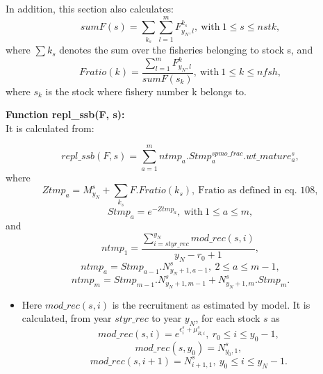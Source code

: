 \documentclass{article}
\begin{document}
In addition, this section also calculates:
\begin{equation}
    sumF(s)=\sum_{k_s}\sum_{l=1}^m F^{k_s}_{y_N,l}, \  \text{with} \ 1\leq s \leq nstk,
\end{equation}
where $\sum k_s$ denotes the sum over the fisheries belonging to stock s, and
\begin{equation}
    Fratio(k)=\dfrac{\sum_{l=1}^mF^k_{y_N,l}}{sumF(s_k)}, \  \text{with} \ 1\leq k  \leq nfsh,
\end{equation}
where $s_k$ is the stock where fishery number k belongs to.

\textbf{Function repl\_ssb(F, s):}\\
It is calculated from:

\begin{equation}
    repl\_ssb(F,s)=\sum_{a=1}^m ntmp_a. Stmp^{spmo\_frac}_a.wt\_mature^s_a,
\end{equation}
where
\begin{equation}
    Ztmp_a=M^s_{y_N}+\sum_{k_s}F.Fratio(k_s), \ \text{Fratio as defined in eq. 108},
\end{equation}
\begin{equation}
    Stmp_a=e^{-Ztmp_a}, \ \text{with} \ 1\leq a \leq m,
\end{equation}
and
\begin{equation}
    ntmp_1 = \dfrac{\displaystyle\sum_{i=styr\_rec}^{y_N} {mod\_rec}(s,i)}{{y_N}-r_0+1},
\end{equation}
\begin{equation}
    ntmp_a=Stmp_{a-1}.N^s_{y_N+1,{a-1}}, \ 2\leq a\leq m-1,
\end{equation}
\begin{equation}
    ntmp_{m}=Stmp_{m-1}.N^s_{y_N+1,m-1}+N^s_{y_N+1,m}.Stmp_{m}.
\end{equation}
\begin{itemize}
    \item Here $mod\_rec(s,i)$ is the recruitment as estimated by model. It is calculated, from year $styr\_rec$ to year $y_N$, for each stock $s$ as
     \begin{equation}
        mod\_rec(s,i)=e^{\epsilon^s_i+\mu^s_{R,i}}, \ r_0\leq i \leq y_0-1,
    \end{equation}
    \begin{equation}
        mod\_rec(s,y_0)=N^s_{y_0,1},
    \end{equation}
    \begin{equation}
        mod\_rec(s,i+1)=N^s_{i+1,1}, \ y_0\leq i \leq y_N-1.
    \end{equation}
   
\end{itemize}
\end{document}
